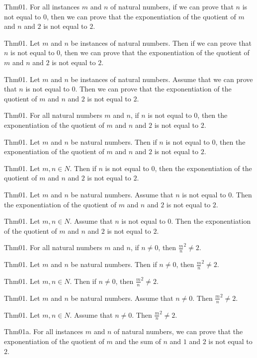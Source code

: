 \documentclass{article}
\begin{document}
Thm01. For all instances $m$ and $n$ of natural numbers, if we can prove that $n$ is not equal to $0$, then we can prove that the exponentiation of the quotient of $m$ and $n$ and $2$ is not equal to $2$.

Thm01. Let $m$ and $n$ be instances of natural numbers. Then if we can prove that $n$ is not equal to $0$, then we can prove that the exponentiation of the quotient of $m$ and $n$ and $2$ is not equal to $2$.

Thm01. Let $m$ and $n$ be instances of natural numbers. Assume that we can prove that $n$ is not equal to $0$. Then we can prove that the exponentiation of the quotient of $m$ and $n$ and $2$ is not equal to $2$.

Thm01. For all natural numbers $m$ and $n$, if $n$ is not equal to $0$, then the exponentiation of the quotient of $m$ and $n$ and $2$ is not equal to $2$.

Thm01. Let $m$ and $n$ be natural numbers. Then if $n$ is not equal to $0$, then the exponentiation of the quotient of $m$ and $n$ and $2$ is not equal to $2$.

Thm01. Let $m , n \in N$. Then if $n$ is not equal to $0$, then the exponentiation of the quotient of $m$ and $n$ and $2$ is not equal to $2$.

Thm01. Let $m$ and $n$ be natural numbers. Assume that $n$ is not equal to $0$. Then the exponentiation of the quotient of $m$ and $n$ and $2$ is not equal to $2$.

Thm01. Let $m , n \in N$. Assume that $n$ is not equal to $0$. Then the exponentiation of the quotient of $m$ and $n$ and $2$ is not equal to $2$.

Thm01. For all natural numbers $m$ and $n$, if $n \neq 0$, then ${\frac{ m }{ n}}^{ 2}\neq 2$.

Thm01. Let $m$ and $n$ be natural numbers. Then if $n \neq 0$, then ${\frac{ m }{ n}}^{ 2}\neq 2$.

Thm01. Let $m , n \in N$. Then if $n \neq 0$, then ${\frac{ m }{ n}}^{ 2}\neq 2$.

Thm01. Let $m$ and $n$ be natural numbers. Assume that $n \neq 0$. Then ${\frac{ m }{ n}}^{ 2}\neq 2$.

Thm01. Let $m , n \in N$. Assume that $n \neq 0$. Then ${\frac{ m }{ n}}^{ 2}\neq 2$.

Thm01a. For all instances $m$ and $n$ of natural numbers, we can prove that the exponentiation of the quotient of $m$ and the sum of $n$ and $1$ and $2$ is not equal to $2$.
\end{document}
